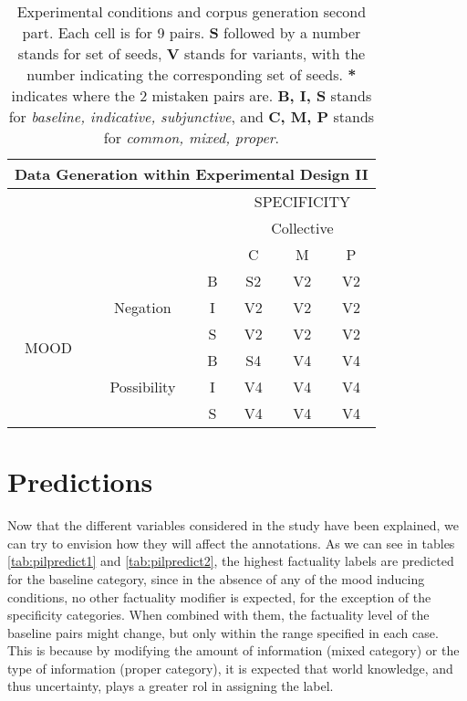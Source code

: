 \begin{table}[h!]
\centering
\begin{tabular}{|c|c|c|c|c|c|}
\hline
\multicolumn{6}{|c|}{Data Generation within Experimental Design II}\\\hline
                      & & &\multicolumn{3}{c|}{SPECIFICITY} \\\cline{4-6} 
                      & & & \multicolumn{3}{c|}{Collective}\\\cline{4-6} 
                      & & & C & M & P \\\hline 
\multirow{6}{*}{MOOD} & \multirow{3}{*}{Negation} & B &S2 &V2 &V2\\\cline{3-6}
                      &                           & I & V2 &V2 &V2\\\cline{3-6}
                      &                           & S &V2 &V2 &V2\\ \cline{2-6}\cline{2-6}                     
                      &\multirow{3}{*}{Possibility}& B&S4 &V4 &V4\\\cline{3-6}
                      &                           & I & V4 & V4 & V4\\\cline{3-6}
                      &                           & S  & V4 & V4 & V4\\\hline                                                          
\end{tabular}
\caption[Experimental conditions and corpus generation II.]{Experimental conditions and corpus generation second part. Each cell is for 9 pairs. \textbf{S} followed by a number stands for set of seeds, \textbf{V} stands for variants, with the number indicating the corresponding set of seeds. \textbf{*} indicates where the 2 mistaken pairs are. \textbf{B, I, S} stands for \textit{baseline, indicative, subjunctive}, and \textbf{C, M, P} stands for \textit{common, mixed, proper}.}
\label{tab:datagen2}
\end{table}

\section{Predictions}
Now that the different variables considered in the study have been explained, we can try to envision how they will affect the annotations. As we can see in tables \ref{tab:pilpredict1} and \ref{tab:pilpredict2}, the highest factuality labels are predicted for the baseline category, since in the absence of any of the mood inducing conditions, no other factuality modifier is expected, for the exception of the specificity categories. When combined with them, the factuality level of the baseline pairs might change, but only within the range specified in each case. This is because by modifying the amount of information (mixed category) or the type of information (proper category), it is expected that world knowledge, and thus uncertainty, plays a greater rol in assigning the label.\\

